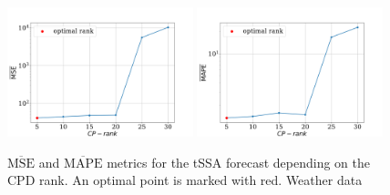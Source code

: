 \documentclass[referee, pdflatex, sn-mathphys-num]{sn-jnl}
\theoremstyle{definition}
\theoremstyle{plain}
\begin{document}
		\begin{figure}[h]
			\centering
			\includegraphics[width=0.48\textwidth, keepaspectratio]{pred_MSE_rank_weather.png}
			\includegraphics[width=0.48\textwidth, keepaspectratio]{pred_MAPE_rank_weather.png}
			\caption{$ \overline{\text{MSE}} $ and $ \overline{\text{MAPE}} $ metrics for the tSSA forecast depending on the CPD rank. An optimal point is marked with red. Weather data}\label{fig:mse_mape_weather}
		\end{figure}
		
\end{document}
